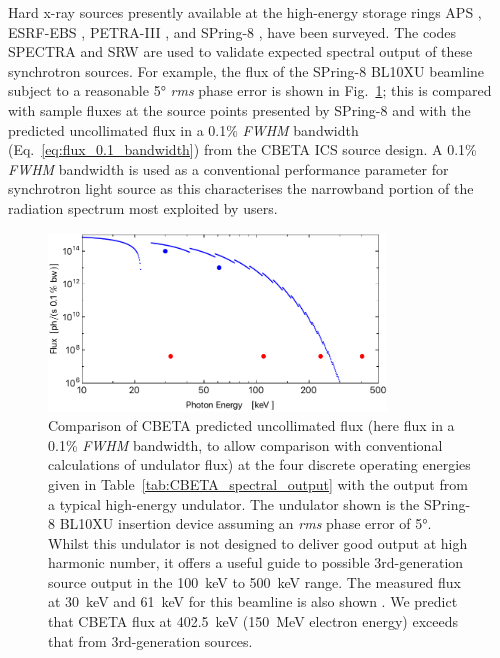 \documentclass[../main.tex]{subfiles}
\begin{document}
Hard x-ray sources presently available at the high-energy storage rings APS \cite{apsbeamlines}, ESRF-EBS \cite{esrfbeamlines}, PETRA-III \cite{petraiiibeamlines}, and SPring-8 \cite{spring8beamlines}, have been surveyed. The codes \textsc{SPECTRA} \cite{tanaka2001spectra} and \textsc{SRW} \cite{chubar2013wavefront} are used to validate expected spectral output \cite{tanaka2001field} of these synchrotron sources. For example, the flux of the SPring-8 BL10XU beamline subject to a reasonable 5\si{\degree} \textit{rms} phase error is shown in Fig.~\ref{fig:ICS_vs_SPRING8_Undulator_Flux}; this is compared with sample fluxes at the source points presented by SPring-8 \cite{spring8beamlines} and with the predicted uncollimated flux in a 0.1\% \textit{FWHM} bandwidth (Eq.~\ref{eq:flux_0.1_bandwidth}) from the CBETA ICS source design. A 0.1\% \textit{FWHM} bandwidth is used as a conventional performance parameter for synchrotron light source as this characterises the narrowband portion of the radiation spectrum most exploited by users. 
\begin{figure}[!h]
\centering
\includegraphics[width=0.8\textwidth]{Figures/CBETA_Inverse_Compton_Source_Design/spring8bl10fluxplot.pdf}
\caption{Comparison of CBETA predicted uncollimated flux (here flux in a 0.1\% \textit{FWHM} bandwidth, to allow comparison with conventional calculations of undulator flux) at the four discrete operating energies given in Table~\ref{tab:CBETA_spectral_output} with the output from a typical high-energy undulator. The undulator shown is the SPring-8 BL10XU insertion device \cite{spring8beamlines} assuming an \textit{rms} phase error of 5\si{\degree}. Whilst this undulator is not designed to deliver good output at high harmonic number, it offers a useful guide to possible 3rd-generation source output in the 100~\si{\kilo\electronvolt} to 500~\si{\kilo\electronvolt} range. The measured flux at 30~\si{\kilo\electronvolt} and 61~\si{\kilo\electronvolt} for this beamline is also shown \cite{spring8beamlines}. We predict that CBETA flux at 402.5~\si{\kilo\electronvolt} (150~\si{\mega\electronvolt} electron energy) exceeds that from 3rd-generation sources.}
\label{fig:ICS_vs_SPRING8_Undulator_Flux}
\end{figure}
\end{document}
